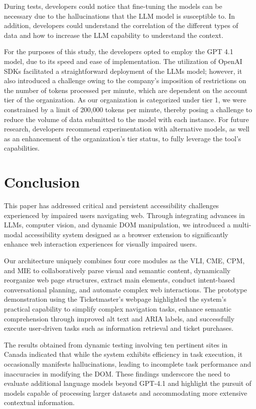 \documentclass[conference]{IEEEtran}
\begin{document}
During tests, developers could notice that fine-tuning the models can be necessary due to the hallucinations that the LLM model is susceptible to. In addition, developers could understand the correlation of the different types of data and how to increase the LLM capability to understand the context. 

For the purposes of this study, the developers opted to employ the GPT 4.1 model, due to its speed and ease of implementation. The utilization of OpenAI SDKs facilitated a straightforward deployment of the LLMs model; however, it also introduced a challenge owing to the company's imposition of restrictions on the number of tokens processed per minute, which are dependent on the account tier of the organization. As our organization is categorized under tier 1, we were constrained by a limit of 200,000 tokens per minute, thereby posing a challenge to reduce the volume of data submitted to the model with each instance. For future research, developers recommend experimentation with alternative models, as well as an enhancement of the organization's tier status, to fully leverage the tool's capabilities.
\section{Conclusion}\label{conclusion}

This paper has addressed critical and persistent accessibility challenges experienced by impaired users navigating web. Through integrating advances in LLMs, computer vision, and dynamic DOM manipulation, we introduced a multi-modal accessibility system designed as a browser extension to significantly enhance web interaction experiences for visually impaired users.

Our architecture uniquely combines four core modules as the VLI, CME, CPM, and MIE to collaboratively parse visual and semantic content, dynamically reorganize web page structures, extract main elements, conduct intent-based conversational planning, and automate complex web interactions. The prototype demonstration using the Ticketmaster's webpage highlighted the system's practical capability to simplify complex navigation tasks, enhance semantic comprehension through improved alt text and ARIA labels, and successfully execute user-driven tasks such as information retrieval and ticket purchases.

The results obtained from dynamic testing involving ten pertinent sites in Canada indicated that while the system exhibits efficiency in task execution, it occasionally manifests hallucinations, leading to incomplete task performance and inaccuracies in modifying the DOM. These findings underscore the need to evaluate additional language models beyond GPT-4.1 and highlight the pursuit of models capable of processing larger datasets and accommodating more extensive contextual information.
\end{document}

